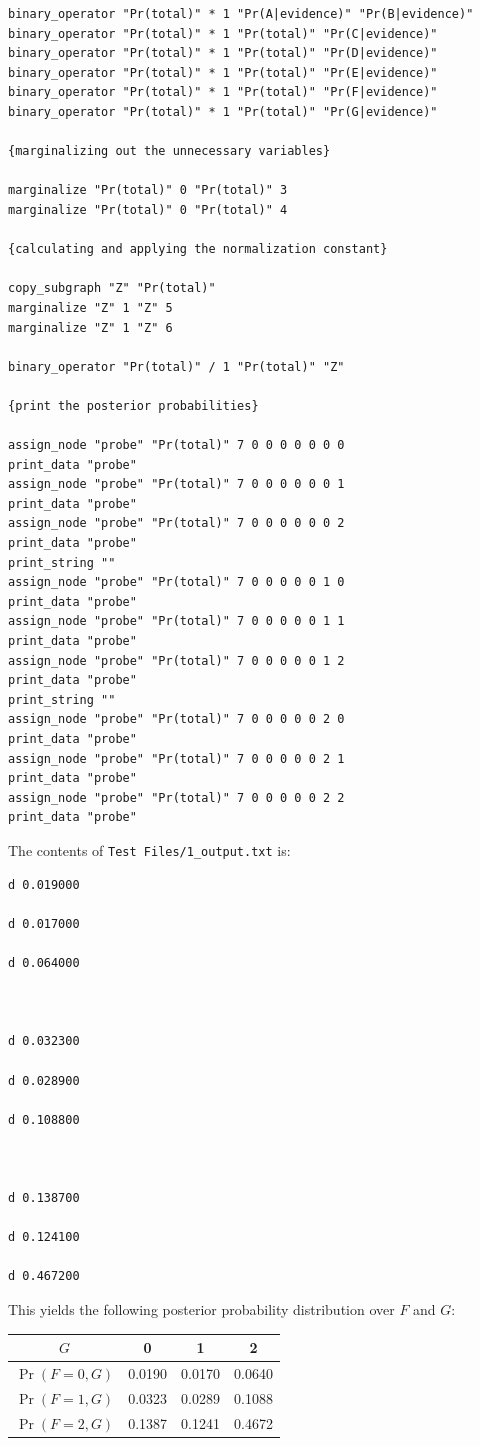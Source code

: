 \documentclass{article}
\begin{document}
\begin{verbatim}
binary_operator "Pr(total)" * 1 "Pr(A|evidence)" "Pr(B|evidence)"
binary_operator "Pr(total)" * 1 "Pr(total)" "Pr(C|evidence)"
binary_operator "Pr(total)" * 1 "Pr(total)" "Pr(D|evidence)"
binary_operator "Pr(total)" * 1 "Pr(total)" "Pr(E|evidence)"
binary_operator "Pr(total)" * 1 "Pr(total)" "Pr(F|evidence)"
binary_operator "Pr(total)" * 1 "Pr(total)" "Pr(G|evidence)"

{marginalizing out the unnecessary variables}

marginalize "Pr(total)" 0 "Pr(total)" 3
marginalize "Pr(total)" 0 "Pr(total)" 4

{calculating and applying the normalization constant}

copy_subgraph "Z" "Pr(total)" 
marginalize "Z" 1 "Z" 5 
marginalize "Z" 1 "Z" 6 

binary_operator "Pr(total)" / 1 "Pr(total)" "Z" 

{print the posterior probabilities}

assign_node "probe" "Pr(total)" 7 0 0 0 0 0 0 0 
print_data "probe"
assign_node "probe" "Pr(total)" 7 0 0 0 0 0 0 1 
print_data "probe"
assign_node "probe" "Pr(total)" 7 0 0 0 0 0 0 2 
print_data "probe"
print_string ""
assign_node "probe" "Pr(total)" 7 0 0 0 0 0 1 0 
print_data "probe"
assign_node "probe" "Pr(total)" 7 0 0 0 0 0 1 1 
print_data "probe"
assign_node "probe" "Pr(total)" 7 0 0 0 0 0 1 2 
print_data "probe"
print_string ""
assign_node "probe" "Pr(total)" 7 0 0 0 0 0 2 0 
print_data "probe"
assign_node "probe" "Pr(total)" 7 0 0 0 0 0 2 1 
print_data "probe"
assign_node "probe" "Pr(total)" 7 0 0 0 0 0 2 2 
print_data "probe"

\end{verbatim}

The contents of \texttt{Test Files/1\_output.txt} is:

\begin{verbatim}
d 0.019000

d 0.017000

d 0.064000



d 0.032300

d 0.028900

d 0.108800



d 0.138700

d 0.124100

d 0.467200
\end{verbatim}

This yields the following posterior probability distribution over \(F\) and \(G\):

\begin{tabular}{|c||c|c|c|}
\hline
\(G\) & 0 & 1 & 2 \\
\hline
\hline
\(\Pr(F=0,G)\) & 0.0190 & 0.0170 & 0.0640 \\ 
\(\Pr(F=1,G)\) & 0.0323 & 0.0289 & 0.1088 \\
\(\Pr(F=2,G)\) & 0.1387 & 0.1241 & 0.4672 \\
\hline
\end{tabular}
\end{document}
